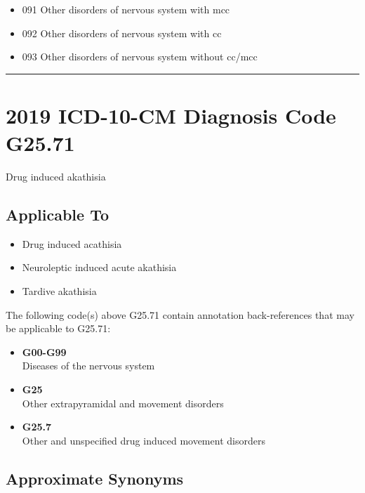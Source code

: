 \begin{itemize}
\tightlist
\item
  091 Other disorders of nervous system with mcc
\item
  092 Other disorders of nervous system with cc
\item
  093 Other disorders of nervous system without cc/mcc
\end{itemize}

\begin{center}\rule{0.5\linewidth}{\linethickness}\end{center}

\hypertarget{icd-10-cm-diagnosis-code-g25.71}{%
\section{2019 ICD-10-CM Diagnosis Code G25.71}\label{icd-10-cm-diagnosis-code-g25.71}}

Drug induced akathisia

\hypertarget{applicable-to-1}{%
\subsection{Applicable To}\label{applicable-to-1}}

\begin{itemize}
\tightlist
\item
  Drug induced acathisia
\item
  Neuroleptic induced acute akathisia
\item
  Tardive akathisia
\end{itemize}

The following code(s) above G25.71 contain annotation back-references that may be applicable to G25.71:

\begin{itemize}
\tightlist
\item
  \textbf{G00-G99}\\
  Diseases of the nervous system
\item
  \textbf{G25}\\
  Other extrapyramidal and movement disorders
\item
  \textbf{G25.7}\\
  Other and unspecified drug induced movement disorders
\end{itemize}

\hypertarget{approximate-synonyms-1}{%
\subsection{Approximate Synonyms}\label{approximate-synonyms-1}}


